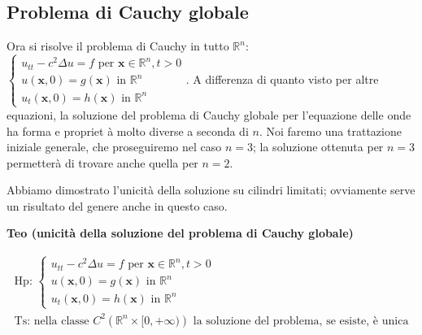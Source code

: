 \documentclass{article}
\begin{document}
\subsection{Problema di Cauchy globale}

Ora si risolve il problema di Cauchy in tutto $%
\mathbb{R}
^{n}$: $\left\{ 
\begin{array}{c}
u_{tt}-c^{2}\Delta u=f\text{ per }\mathbf{x}\in 
\mathbb{R}
^{n},t>0 \\ 
u\left( \mathbf{x},0\right) =g\left( \mathbf{x}\right) \text{ in }%
\mathbb{R}
^{n} \\ 
u_{t}\left( \mathbf{x},0\right) =h\left( \mathbf{x}\right) \text{ in }%
\mathbb{R}
^{n}%
\end{array}%
\right. $. A differenza di quanto visto per altre equazioni, la soluzione
del problema di Cauchy globale per l'equazione delle onde ha forma e propriet%
\`{a} molto diverse a seconda di $n$. Noi faremo una trattazione iniziale
generale, che proseguiremo nel caso $n=3$; la soluzione ottenuta per $n=3$
permetter\`{a} di trovare anche quella per $n=2$.

Abbiamo dimostrato l'unicit\`{a} della soluzione su cilindri limitati;
ovviamente serve un risultato del genere anche in questo caso.

\textbf{Teo (unicit\`{a} della soluzione del problema di Cauchy globale) }

\begin{gather*}
\text{Hp: }\left\{ 
\begin{array}{c}
u_{tt}-c^{2}\Delta u=f\text{ per }\mathbf{x}\in 
\mathbb{R}
^{n},t>0 \\ 
u\left( \mathbf{x},0\right) =g\left( \mathbf{x}\right) \text{ in }%
\mathbb{R}
^{n} \\ 
u_{t}\left( \mathbf{x},0\right) =h\left( \mathbf{x}\right) \text{ in }%
\mathbb{R}
^{n}%
\end{array}%
\right. \\
\text{Ts: nella classe }C^{2}\left( 
\mathbb{R}
^{n}\times \lbrack 0,+\infty )\right) \text{ la soluzione del problema, se
esiste, \`{e} unica}
\end{gather*}
\end{document}
